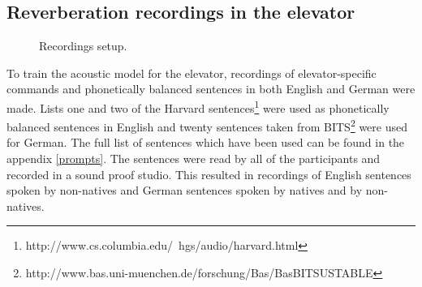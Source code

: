 \documentclass[a4paper, 12pt]{article}
\begin{document}
\subsection{Reverberation recordings in the elevator}

\begin{figure}
\caption{Recordings setup.}
\label{fig:recordingsetup}
\end{figure}


To train the acoustic model for the elevator, recordings of elevator-specific commands and phonetically balanced sentences in both English and German were made.
Lists one and two  of the Harvard sentences\footnote{http://www.cs.columbia.edu/~hgs/audio/harvard.html} were used as phonetically balanced sentences in English and twenty sentences taken from BITS\footnote{http://www.bas.uni-muenchen.de/forschung/Bas/BasBITSUSTABLE} were used for German.
The full list of sentences which have been used can be found in the appendix \ref{prompts}.
The sentences were read by all of the participants and recorded in a sound proof studio.
This resulted in recordings of English sentences spoken by non-natives and German sentences spoken by natives and by non-natives.
\end{document}
